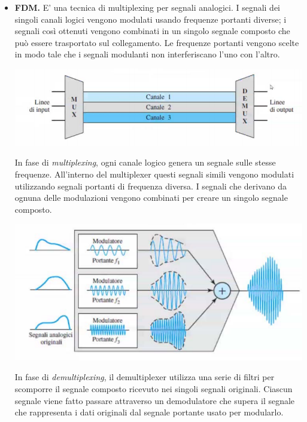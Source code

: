         \begin{itemize}
            \item 
                \textbf{FDM.} E' una tecnica di multiplexing per  segnali analogici. I segnali dei singoli canali logici vengono modulati usando frequenze portanti diverse; i segnali così ottenuti vengono combinati in un singolo segnale composto che può essere trasportato sul collegamento. Le frequenze portanti vengono scelte in modo tale che i segnali modulanti non interferiscano l'uno con l'altro.
                
                \begin{center}
                    \includegraphics[scale=0.6]{images/FDM.png}
                \end{center}
                
                In fase di \textit{multiplexing}, ogni canale logico genera un segnale sulle stesse frequenze. All'interno del multiplexer questi segnali simili vengono modulati utilizzando segnali portanti di frequenza diversa. I segnali che derivano da ognuna delle modulazioni vengono combinati per creare un singolo segnale composto.
                
                \begin{center}
                    \includegraphics[scale=0.6]{images/FDM_Mult.png}
                \end{center}
                
                In fase di \textit{demultiplexing}, il demultiplexer utilizza una serie di filtri per scomporre il segnale composto ricevuto nei singoli segnali originali. Ciascun segnale viene fatto passare attraverso un demodulatore che supera il segnale che rappresenta i dati originali dal segnale portante usato per modularlo.
            

\end{itemize}
